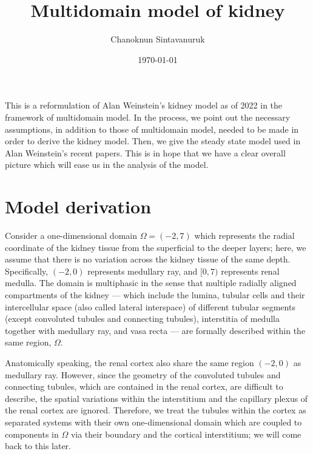 \documentclass{article}
\title{Multidomain model of kidney}
\author[1]{Chanoknun Sintavanuruk}
\date{\today}
\begin{document}
\sloppy %
\maketitle

This is a reformulation of Alan Weinstein's kidney model as of 2022 in the framework of multidomain model.
In the process, we point out the necessary assumptions, in addition to those of multidomain model, needed to be made in order to derive the kidney model.
Then, we give the steady state model used in Alan Weinstein's recent papers.
This is in hope that we have a clear overall picture which will ease us in the analysis of the model.

\section{Model derivation}

Consider a one-dimensional domain $\Omega = (-2,7)$ which represents the radial coordinate of the kidney tissue from the superficial to the deeper layers; here, we assume that there is no variation across the kidney tissue of the same depth.
Specifically, $(-2,0)$ represents medullary ray, and $[0,7)$ represents renal medulla.
The domain is multiphasic in the sense that multiple radially aligned compartments of the kidney --- which include the lumina, tubular cells and their intercellular space (also called lateral interspace) of different tubular segments (except convoluted tubules and connecting tubules), interstitia of medulla together with medullary ray, and vasa recta --- are formally described within the same region, $\Omega$.

Anatomically speaking, the renal cortex also share the same region $(-2,0)$ as medullary ray.
However, since the geometry of the convoluted tubules and connecting tubules, which are contained in the renal cortex, are difficult to describe, the spatial variations within the interstitium and the capillary plexus of the renal cortex are ignored.
Therefore, we treat the tubules within the cortex as separated systems with their own one-dimensional domain which are coupled to components in $\Omega$ via their boundary and the cortical interstitium; we will come back to this later.
\end{document}

